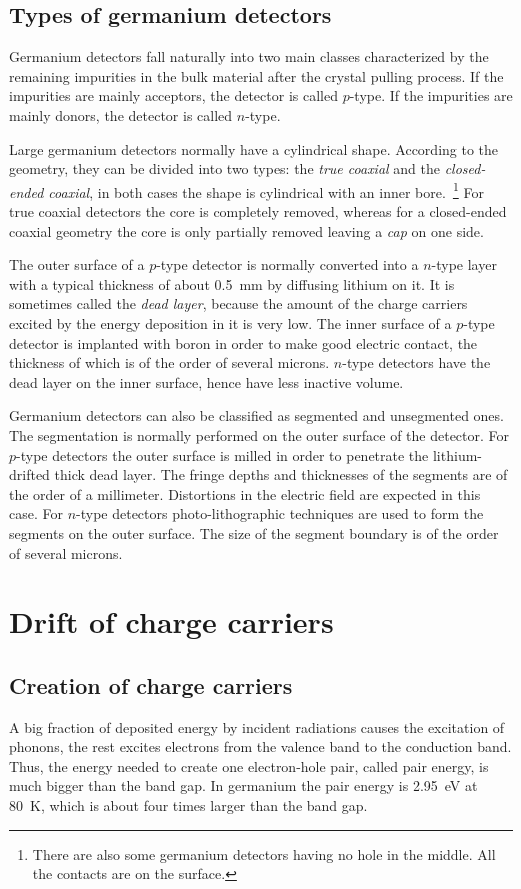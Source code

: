 \subsection{Types of germanium detectors}
\label{sec:det:type}
Germanium detectors fall naturally into two main classes characterized by the remaining impurities in the bulk material after the crystal pulling process. If the impurities are mainly acceptors, the detector is called $p$-type. If the impurities are mainly donors, the detector is called $n$-type. 

Large germanium detectors normally have a cylindrical shape. According to the geometry, they can be divided into two types: the \textit{true coaxial} and the \textit{closed-ended coaxial}, in both cases the shape is cylindrical with an inner bore.~\footnote{There are also some germanium detectors having no hole in the middle. All the contacts are on the surface.} For true coaxial detectors the core is completely removed, whereas for a closed-ended coaxial geometry the core is only partially removed leaving a \textit{cap} on one side.

The outer surface of a $p$-type detector is normally converted into a $n$-type layer with a typical thickness of about 0.5~mm by diffusing lithium on it. It is sometimes called the \textit{dead layer}, because the amount of the charge carriers excited by the energy deposition in it is very low. The inner surface of a $p$-type detector is implanted with boron in order to make good electric contact, the thickness of which is of the order of several microns. $n$-type detectors have the dead layer on the inner surface, hence have less inactive volume.

Germanium detectors can also be classified as segmented and unsegmented ones. The segmentation is normally performed on the outer surface of the detector. For $p$-type detectors the outer surface is milled in order to penetrate the lithium-drifted thick dead layer. The fringe depths and thicknesses of the segments are of the order of a millimeter. Distortions in the electric field are expected in this case. For $n$-type detectors photo-lithographic techniques are used to form the segments on the outer surface. The size of the segment boundary is of the order of several microns.

\section{Drift of charge carriers}
\label{sec:det:drift}
\subsection{Creation of charge carriers}
\label{sec:det:exit}
A big fraction of deposited energy by incident radiations causes the excitation of phonons, the rest excites electrons from the valence band to the conduction band. Thus, the energy needed to create one electron-hole pair, called pair energy, is much bigger than the band gap. In germanium the pair energy is 2.95~eV at 80~K, which is about four times larger than the band gap.

